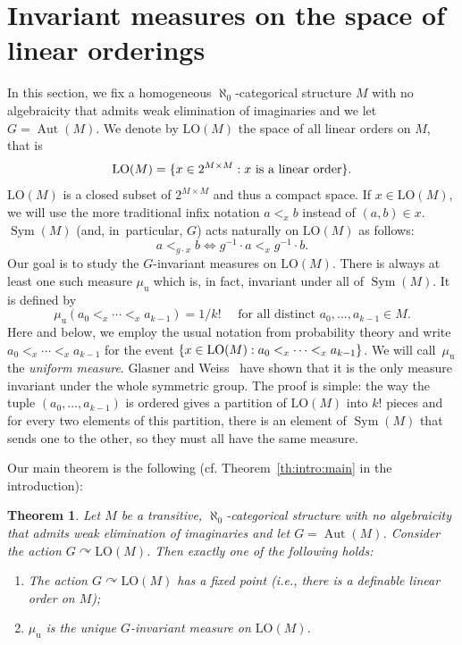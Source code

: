 \documentclass[11pt]{article}
\newcommand{\ie}{i.e.,\xspace}
\newcommand{\cf}{cf.\xspace}
\let\actson\curvearrowright
\theoremstyle{plain}
\newtheorem{theorem}{Theorem}[section]
\theoremstyle{definition}
\DeclareMathOperator{\Aut}{Aut}
\DeclareMathOperator{\Sym}{Sym}
\DeclarePairedDelimiter\set{\{}{\}}
\newcommand{\LO}{\mathrm{LO}}
\newcommand{\muu}{\mu_{\mathrm{u}}}
\begin{document}

\section{Invariant measures on the space of linear orderings}
\label{sec:invar-meas-space}

In this section, we fix a homogeneous $\aleph_0$-categorical structure $M$ with no algebraicity that admits weak elimination of imaginaries and we let $G = \Aut(M)$. We denote by $\LO(M)$ the space of all linear orders on $M$, that is
\begin{equation*}
\LO(M) = \set{x \in 2^{M \times M} : x \text{ is a linear order}}.
\end{equation*}
$\LO(M)$ is a closed subset of $2^{M \times M}$ and thus a compact space. If $x \in \LO(M)$, we will use the more traditional infix notation $a <_x b$ instead of $(a, b) \in x$. $\Sym(M)$ (and, in~particular, $G$) acts naturally on $\LO(M)$ as follows:
\begin{equation*}
a <_{g \cdot x} b \iff g^{-1} \cdot a <_x g^{-1} \cdot b.
\end{equation*}
Our goal is to study the $G$-invariant measures on $\LO(M)$. There is always at least one such measure $\muu$ which is, in fact, invariant under all of $\Sym(M)$. It is defined by
\begin{equation*}
\muu(a_0 <_x \cdots <_x a_{k-1}) = 1/k! \quad \text{ for all distinct } a_0, \ldots, a_{k-1} \in M.
\end{equation*}
Here and below, we employ the usual notation from probability theory and write $a_0 <_x \cdots <_x a_{k-1}$ for the event $\set{x \in \LO(M) : a_0 <_x \cdots <_x a_{k-1}}$. We will call~$\muu$ the \emph{uniform measure}. Glasner and Weiss~\cite{Glasner2002a} have shown that it is the only measure invariant under the whole symmetric group. The proof is simple: the way the tuple $(a_0, \ldots, a_{k-1})$ is ordered gives a partition of $\LO(M)$ into $k!$ pieces and for every two elements of this partition, there is an element of $\Sym(M)$ that sends one to the other, so they must all have the same measure.

Our main theorem is the following (\cf Theorem~\ref{th:intro:main} in the introduction):
\begin{theorem}
\label{Thm:Princip} Let $M$ be a transitive, $\aleph_0$-categorical structure with no algebraicity that admits weak elimination of imaginaries and let $G=\Aut(M)$. Consider the action $G \actson \LO(M)$. Then exactly one of the following holds:
\begin{enumerate}
\item The action $G \actson \LO(M)$ has a fixed point (\ie there is a definable linear order on $M$);
\item $\muu$ is the unique $G$-invariant measure on $\LO(M)$.
\end{enumerate}
\end{theorem}
\end{document}
